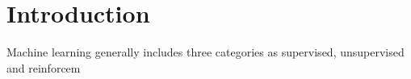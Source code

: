 \section{Introduction}

Machine learning generally includes three categories as supervised, unsupervised and reinforcem

